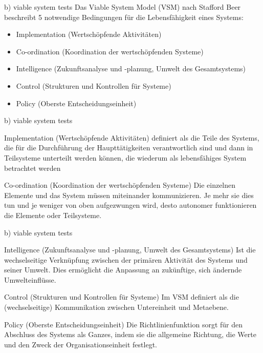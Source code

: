 \documentclass{beamer}
\begin{document}
	\begin{frame}{b) viable system tests}
    	Das Viable System Model (VSM) nach Stafford Beer beschreibt 5 notwendige Bedingungen für die Lebensfähigkeit eines Systems:
		\begin{itemize}
			\item Implementation (Wertschöpfende Aktivitäten)
			\item Co-ordination (Koordination der wertschöpfenden Systeme)
			\item Intelligence  (Zukunftsanalyse und -planung, Umwelt des Gesamtsystems)
			\item Control (Strukturen und Kontrollen für Systeme)
			\item Policy (Oberste Entscheidungseinheit)
		\end{itemize}
	\end{frame}
	
	\begin{frame}{b) viable system tests}
		\begin{block}{Implementation (Wertschöpfende Aktivitäten)}
			definiert als die Teile des Systems, die für die Durchführung der Haupttätigkeiten verantwortlich sind und dann in Teilsysteme unterteilt werden können, die wiederum als lebensfähiges System betrachtet werden 
		\end{block}
		\begin{block}{Co-ordination (Koordination der wertschöpfenden Systeme)}
			Die einzelnen Elemente und das System müssen miteinander kommunizieren. Je mehr sie dies tun und je weniger von oben aufgezwungen wird, desto autonomer funktionieren die Elemente oder Teilsysteme.
		\end{block}
	\end{frame}
	
	\begin{frame}{b) viable system tests}
		\begin{block}{Intelligence  (Zukunftsanalyse und -planung, Umwelt des Gesamtsystems)}
			Ist die wechselseitige Verknüpfung zwischen der primären Aktivität des Systems und seiner Umwelt. Dies ermöglicht die Anpassung an zukünftige, sich ändernde Umwelteinflüsse.
		\end{block}
		\begin{block}{Control (Strukturen und Kontrollen für Systeme)}
			Im VSM definiert als die (wechselseitige) Kommunikation zwischen Untereinheit und Metaebene.
		\end{block}
		\begin{block}{Policy (Oberste Entscheidungseinheit)}
			Die Richtlinienfunktion sorgt für den Abschluss des Systems als Ganzes, indem sie die allgemeine Richtung, die Werte und den Zweck der Organisationseinheit festlegt.
		\end{block}
	\end{frame}
	
\end{document}
